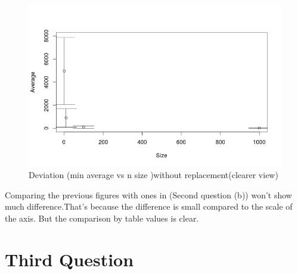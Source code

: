 \documentclass{article}
\begin{document}
	\begin{figure}[H]
		\begin{center}
			\includegraphics[scale=0.7]{plotmin4no.png}
		\end{center}
		\caption{Deviation (min average vs n size )without replacement(clearer view)}
	\end{figure}
	Comparing the previous figures with ones in (Second question (b)) won't show much difference.That's because the difference is small compared to the scale of the axis. But the comparison by table values is clear.
	\section*{Third Question}
\end{document}
